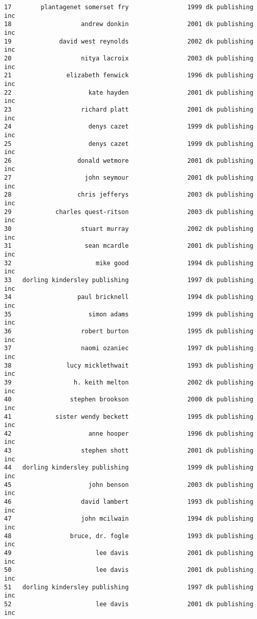 \documentclass[
]{report}
\begin{document}
\begin{verbatim}
17        plantagenet somerset fry                1999 dk publishing inc
18                   andrew donkin                2001 dk publishing inc
19             david west reynolds                2002 dk publishing inc
20                   nitya lacroix                2003 dk publishing inc
21               elizabeth fenwick                1996 dk publishing inc
22                     kate hayden                2001 dk publishing inc
23                   richard platt                2001 dk publishing inc
24                     denys cazet                1999 dk publishing inc
25                     denys cazet                1999 dk publishing inc
26                  donald wetmore                2001 dk publishing inc
27                    john seymour                2001 dk publishing inc
28                  chris jefferys                2003 dk publishing inc
29            charles quest-ritson                2003 dk publishing inc
30                   stuart murray                2002 dk publishing inc
31                    sean mcardle                2001 dk publishing inc
32                       mike good                1994 dk publishing inc
33   dorling kindersley publishing                1997 dk publishing inc
34                  paul bricknell                1994 dk publishing inc
35                     simon adams                1999 dk publishing inc
36                   robert burton                1995 dk publishing inc
37                   naomi ozaniec                1997 dk publishing inc
38               lucy micklethwait                1993 dk publishing inc
39                 h. keith melton                2002 dk publishing inc
40                stephen brookson                2000 dk publishing inc
41            sister wendy beckett                1995 dk publishing inc
42                     anne hooper                1996 dk publishing inc
43                   stephen shott                2001 dk publishing inc
44   dorling kindersley publishing                1999 dk publishing inc
45                     john benson                2003 dk publishing inc
46                   david lambert                1993 dk publishing inc
47                   john mcilwain                1994 dk publishing inc
48                bruce, dr. fogle                1993 dk publishing inc
49                       lee davis                2001 dk publishing inc
50                       lee davis                2001 dk publishing inc
51   dorling kindersley publishing                1997 dk publishing inc
52                       lee davis                2001 dk publishing inc

\end{verbatim}
\end{document}
